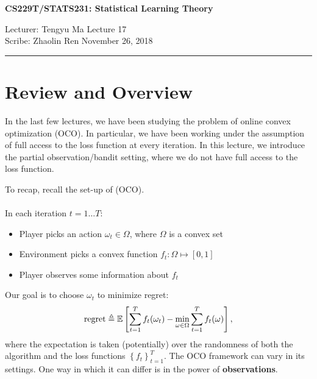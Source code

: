 \documentclass[11pt]{article}
\begin{document}
\thispagestyle{empty}


\begin{center}
\bf\large CS229T/STATS231: Statistical Learning Theory
\end{center}

\noindent
Lecturer: Tengyu Ma   %
\hfill
Lecture 17               %
\\
Scribe: Zhaolin Ren                %
\hfill
November 26, 2018           %

\noindent
\rule{\textwidth}{1pt}

\medskip


\section{Review and Overview}

In the last few lectures, we have been studying the problem of online convex optimization (OCO). In particular, we have been working under the assumption of full access to the loss function at every iteration. In this lecture, we introduce the partial observation/bandit setting, where we do not have full access to the loss function. 

To recap, recall the set-up of (OCO). 
\paragraph{} 
In each iteration $t = 1 \dots T$:
\begin{itemize}
    \item Player picks an action $\omega_t \in \Omega$, where $\Omega$ is a convex set
    \item Environment picks a convex function $f_t: \Omega \mapsto [0,1]$
    \item Player observes some information about $f_t$
\end{itemize}
Our goal is to choose $\omega_t$ to minimize regret:
\begin{gather*}
    \text{regret} \triangleq \mathbb{E} \left[\sum_{t=1}^T f_t(\omega_t) - \min_{\omega \in \Omega} \sum_{t=1}^T f_t(\omega) \right],
\end{gather*}
where the expectation is taken (potentially) over the randomness of both the algorithm and the loss functions $\left\{f_t\right\}_{t=1}^T$. The OCO framework can vary in its settings. One way in which it can differ is in the power of \textbf{observations}.
\end{document}
